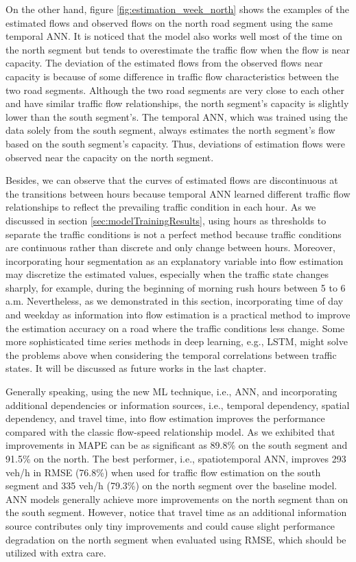 \documentclass[english]{kththesis}
\begin{document}
On the other hand, figure \ref{fig:estimation_week_north} shows the examples of the estimated flows and observed flows on the north road segment using the same temporal ANN. It is noticed that the model also works well most of the time on the north segment but tends to overestimate the traffic flow when the flow is near capacity. The deviation of the estimated flows from the observed flows near capacity is because of some difference in traffic flow characteristics between the two road segments. Although the two road segments are very close to each other and have similar traffic flow relationships, the north segment's capacity is slightly lower than the south segment's. The temporal ANN, which was trained using the data solely from the south segment, always estimates the north segment's flow based on the south segment's capacity. Thus, deviations of estimation flows were observed near the capacity on the north segment.

Besides, we can observe that the curves of estimated flows are discontinuous at the transitions between hours because temporal ANN learned different traffic flow relationships to reflect the prevailing traffic condition in each hour. As we discussed in section \ref{sec:modelTrainingResults}, using hours as thresholds to separate the traffic conditions is not a perfect method because traffic conditions are continuous rather than discrete and only change between hours. Moreover, incorporating hour segmentation as an explanatory variable into flow estimation may discretize the estimated values, especially when the traffic state changes sharply, for example, during the beginning of morning rush hours between 5 to 6 a.m. Nevertheless, as we demonstrated in this section, incorporating time of day and weekday as information into flow estimation is a practical method to improve the estimation accuracy on a road where the traffic conditions less change. Some more sophisticated time series methods in deep learning, e.g., LSTM, might solve the problems above when considering the temporal correlations between traffic states. It will be discussed as future works in the last chapter.

Generally speaking, using the new ML technique, i.e., ANN, and incorporating additional dependencies or information sources, i.e., temporal dependency, spatial dependency, and travel time, into flow estimation improves the performance compared with the classic flow-speed relationship model. As we exhibited that improvements in MAPE can be as significant as 89.8\% on the south segment and 91.5\% on the north. The best performer, i.e., spatiotemporal ANN, improves 293 veh/h in RMSE (76.8\%) when used for traffic flow estimation on the south segment and 335 veh/h (79.3\%) on the north segment over the baseline model. ANN models generally achieve more improvements on the north segment than on the south segment. However, notice that travel time as an additional information source contributes only tiny improvements and could cause slight performance degradation on the north segment when evaluated using RMSE, which should be utilized with extra care.
\end{document}
